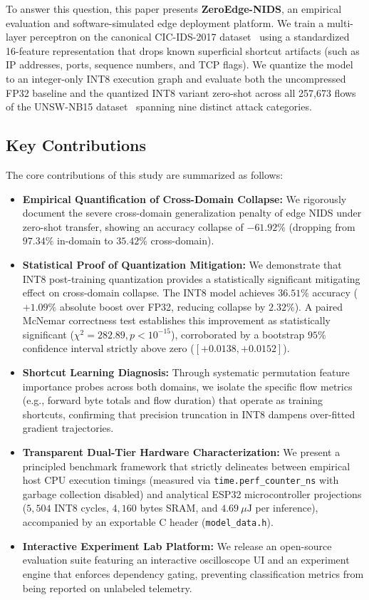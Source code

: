 To answer this question, this paper presents \textbf{ZeroEdge-NIDS}, an empirical evaluation and software-simulated edge deployment platform. We train a multi-layer perceptron on the canonical CIC-IDS-2017 dataset~\cite{sharafaldin2018cicids} using a standardized 16-feature representation that drops known superficial shortcut artifacts (such as IP addresses, ports, sequence numbers, and TCP flags). We quantize the model to an integer-only INT8 execution graph and evaluate both the uncompressed FP32 baseline and the quantized INT8 variant zero-shot across all 257,673 flows of the UNSW-NB15 dataset~\cite{moustafa2015unsw} spanning nine distinct attack categories.

\subsection{Key Contributions}
The core contributions of this study are summarized as follows:
\begin{itemize}
    \item \textbf{Empirical Quantification of Cross-Domain Collapse:} We rigorously document the severe cross-domain generalization penalty of edge NIDS under zero-shot transfer, showing an accuracy collapse of $-61.92\%$ (dropping from $97.34\%$ in-domain to $35.42\%$ cross-domain).
    \item \textbf{Statistical Proof of Quantization Mitigation:} We demonstrate that INT8 post-training quantization provides a statistically significant mitigating effect on cross-domain collapse. The INT8 model achieves $36.51\%$ accuracy ($+1.09\%$ absolute boost over FP32, reducing collapse by $2.32\%$). A paired McNemar correctness test establishes this improvement as statistically significant ($\chi^2 = 282.89, p < 10^{-15}$), corroborated by a bootstrap $95\%$ confidence interval strictly above zero ($[+0.0138, +0.0152]$).
    \item \textbf{Shortcut Learning Diagnosis:} Through systematic permutation feature importance probes across both domains, we isolate the specific flow metrics (e.g., forward byte totals and flow duration) that operate as training shortcuts, confirming that precision truncation in INT8 dampens over-fitted gradient trajectories.
    \item \textbf{Transparent Dual-Tier Hardware Characterization:} We present a principled benchmark framework that strictly delineates between empirical host CPU execution timings (measured via \texttt{time.perf\_counter\_ns} with garbage collection disabled) and analytical ESP32 microcontroller projections ($5,504$ INT8 cycles, $4,160$ bytes SRAM, and $4.69\ \mu\text{J}$ per inference), accompanied by an exportable C header (\texttt{model\_data.h}).
    \item \textbf{Interactive Experiment Lab Platform:} We release an open-source evaluation suite featuring an interactive oscilloscope UI and an experiment engine that enforces dependency gating, preventing classification metrics from being reported on unlabeled telemetry.
\end{itemize}


